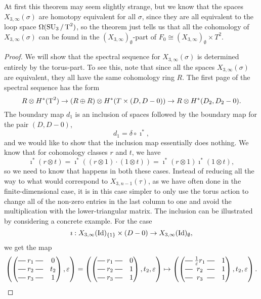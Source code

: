 At first this theorem may seem slightly strange, but we know
that the spaces $X_{3,\infty}(\sigma)$ are homotopy equivalent for all
$\sigma$, since they are all equivalent to the loop space
$\Omega(\operatorname{SU}_3/\operatorname{T}^2)$, so the theorem
just tells us that all the cohomology of $X_{3,\infty}(\sigma)$ can be
found in the $(X_{3,\infty})_{\emptyset}$-part of $F_0 \cong
(X_{3,\infty})_{\emptyset}\times T^2$.

\begin{proof}
  We will show that the spectral sequence for $X_{3,\infty}(\sigma)$
  is determined entirely by the torus-part. To see this, note that
  since all the spaces $X_{3,\infty}(\sigma)$ are equivalent, they all
  have the same cohomology ring $R$. The first page of the spectral
  sequence has the form
  \[ R \otimes H^*(\operatorname{T}^2) \to (R\oplus R)\otimes H^*(T\times (D,D-0))
  \to R\otimes H^*(D_2,D_2-0). \]
  The boundary map $d_1$ is an inclusion of spaces
  followed by the boundary map for the pair $(D,D-0)$,
  \[ d_1 = \delta \circ \imath^*, \]
  and we would like to show that the inclusion map
  essentially does nothing. We know that for cohomology classes $r$
  and $t$, we have
  \[ \imath^*(r \otimes t) = \imath^*((r\otimes 1)\cdot (1\otimes t))
  = \imath^*(r\otimes 1) \imath^*(1\otimes t), \]
  so we need to know that happens in both these cases. Instead of
  reducing all the way to what would correspond to $X_{3,n-1}(\tau)$,
  as we have often done in the finite-dimensional case, it is in this
  case simpler to only use
  the torus action to change all of
  the non-zero entries in the last column to one and avoid the
  multiplication with the lower-triangular matrix. The inclusion
  can be illustrated by considering a concrete example. For the
  case
  \[\imath : X_{3,\infty}(\operatorname{Id})_{\left\{ 1 \right\}}\times(D-0) \to
  X_{3,\infty}(\operatorname{Id})_{\emptyset}, \]
  we get the map
  \[ \left(\begin{pmatrix}
      \matrow{r_1} & 0   \\
      \matrow{r_2} & t_2 \\
      \matrow{r_3} & 1
    \end{pmatrix},\varepsilon\right) =
  \left(\begin{pmatrix}
      \matrow{r_1} & 0 \\
      \matrow{r_2} & 1 \\
      \matrow{r_3} & 1
    \end{pmatrix}, t_2, \varepsilon\right) \mapsto
  \left(\begin{pmatrix}
      \matrow{\frac{1}{\varepsilon}r_1} & 1 \\
      \matrow{r_2} & 1 \\
      \matrow{r_3} & 1
    \end{pmatrix}, t_2,\varepsilon\right). \]
  

\end{proof}
